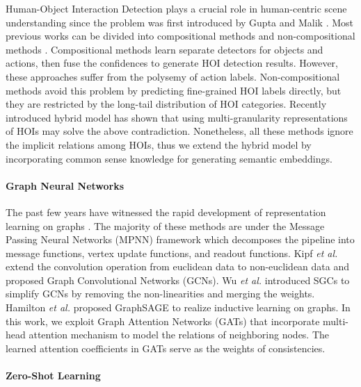 \documentclass[sigconf,screen]{acmart}
\begin{document}
Human-Object Interaction Detection plays a crucial role in human-centric scene understanding since the problem was first introduced by Gupta and Malik \cite{gupta2015visual}. Most previous works can be divided into compositional methods \cite{gkioxari2018detecting,shen2018scaling,gupta2019no,bansal2019detecting} and non-compositional methods \cite{chao2018learning,gao2018ican,li2019transferable,qi2018learning,wang2019deep,wan2019pose}. Compositional methods learn separate detectors for objects and actions, then fuse the confidences to generate HOI detection results. However, these approaches suffer from the polysemy of action labels. Non-compositional methods avoid this problem by predicting fine-grained HOI labels directly, but they are restricted by the long-tail distribution of HOI categories. Recently introduced hybrid model \cite{peyre2019detecting} has shown that using multi-granularity representations of HOIs may solve the above contradiction. Nonetheless, all these methods ignore the implicit relations among HOIs, thus we extend the hybrid model by incorporating common sense knowledge for generating semantic embeddings.

\paragraph{Graph Neural Networks}

The past few years have witnessed the rapid development of representation learning on graphs \cite{jie2018graph}. The majority of these methods are under the Message Passing Neural Networks (MPNN) framework \cite{gilmer2017neural} which decomposes the pipeline into message functions, vertex update functions, and readout functions. Kipf \textit{et al.} \cite{kipf2016semi} extend the convolution operation \cite{lecun1998gradient} from euclidean data to non-euclidean data and proposed Graph Convolutional Networks (GCNs). Wu \textit{et al.} \cite{wu2019simplifying} introduced SGCs to simplify GCNs by removing the non-linearities and merging the weights. Hamilton \textit{et al.} \cite{hamilton2017inductive} proposed GraphSAGE to realize inductive learning on graphs. In this work, we exploit Graph Attention Networks (GATs) \cite{velickovic2018graph} that incorporate multi-head attention mechanism to model the relations of neighboring nodes. The learned attention coefficients in GATs serve as the weights of consistencies.

\paragraph{Zero-Shot Learning}
\end{document}

